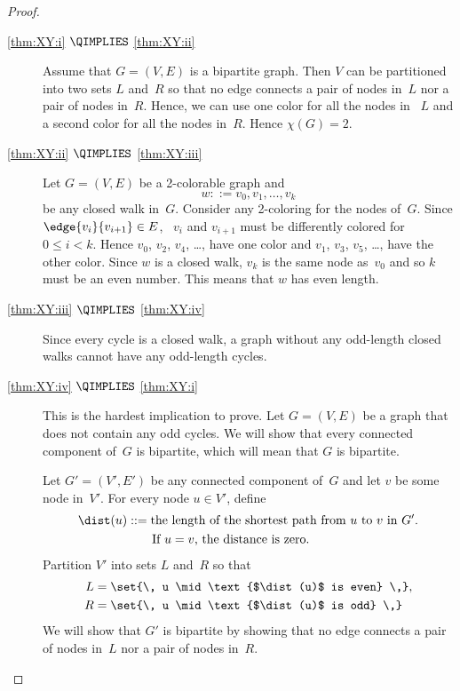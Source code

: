 \begin{editingnotes}
\begin{proof}
\begin{description}

\item[\ref{thm:XY:i} $\QIMPLIES$ \ref{thm:XY:ii}]

Assume that $G = (V, E)$ is a bipartite graph.  Then $V$ can be
partitioned into two sets $L$ and~$R$ so that no edge connects a pair
of nodes in~$L$ nor a pair of nodes in~$R$.  Hence, we can use one
color for all the nodes in ~$L$ and a second color for all the nodes
in~$R$.  Hence $\chi(G) = 2$.

\item[\ref{thm:XY:ii} $\QIMPLIES$ \ref{thm:XY:iii}]

Let $G = (V, E)$ be a 2-colorable graph and
\begin{equation*}
    w ::= v_0, v_1, \dots, v_k
\end{equation*}
be any closed walk in~$G$.  Consider any 2-coloring for the nodes
of~$G$.  Since $\edge{v_i}{v_{i + 1}} \in E$, \ $v_i$ and $v_{i + 1}$
must be differently colored for $0 \le i < k$.  Hence $v_0$, $v_2$,
$v_4$, \dots, have one color and $v_1$, $v_3$, $v_5$, \dots, have the
other color.  Since $w$ is a closed walk, $v_k$ is the same node
as~$v_0$ and so $k$ must be an even number.  This means that $w$ has
even length.

\item[\ref{thm:XY:iii} $\QIMPLIES$ \ref{thm:XY:iv}]

Since every cycle is a closed walk, a graph without any odd-length
closed walks cannot have any odd-length cycles.

\item[\ref{thm:XY:iv} $\QIMPLIES$ \ref{thm:XY:i}]

This is the hardest implication to prove.  Let $G = (V, E)$ be a graph
that does not contain any odd cycles.  We will show that every
connected component of~$G$ is bipartite, which will mean that $G$ is
bipartite.

Let $G' = (V', E')$  be any connected component of~$G$ and let $v$ be
some node in~$V'$.  For every node $u \in V'$, define
\begin{align*}
    \dist(u) & ::= \text{the length of the shortest path from $u$ to
        $v$ in $G'$.} \\
             & \qquad \text{If $u = v$, the distance is zero.}
\end{align*}
Partition $V'$ into sets $L$ and~$R$ so that
\begin{align*}
    L &= \set{\, u \mid \text{$\dist(u)$ is even} \,}, \\
    R &= \set{\, u \mid \text{$\dist(u)$ is odd} \,}
\end{align*}
We will show that $G'$ is bipartite by showing that no edge connects a
pair of nodes in~$L$ nor a pair of nodes in~$R$.


\end{description}
\end{proof}
\end{editingnotes}
